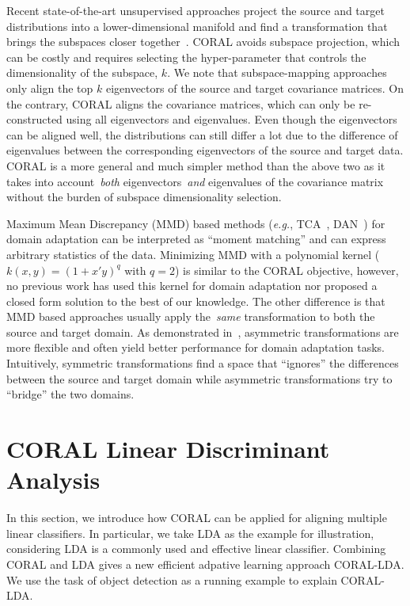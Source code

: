 \documentclass[graybox]{svmult}
\newcommand\eg{\emph{e.g.}}
\begin{document}
Recent state-of-the-art unsupervised approaches project the source and target distributions into a lower-dimensional manifold and find a transformation that brings the subspaces closer together~\cite{gopalan-iccv11,gfk,sa,outlooks}. CORAL avoids subspace projection, which can be costly and requires selecting the hyper-parameter that controls the dimensionality of the subspace, $k$. We note that subspace-mapping approaches~\cite{outlooks,sa} only align the top $k$ eigenvectors of the source and target covariance matrices. On the contrary, CORAL aligns the covariance matrices, which can only be re-constructed using all eigenvectors and eigenvalues. Even though the eigenvectors can be aligned well, the distributions can still differ a lot due to the difference of eigenvalues between the corresponding eigenvectors of the source and target data. CORAL is a more general and much simpler method than the above two as it takes into account~\emph{both} eigenvectors~\emph{and} eigenvalues of the covariance matrix without the burden of subspace dimensionality selection. 

Maximum Mean Discrepancy (MMD) based methods (\eg, TCA~\cite{tca}, DAN~\cite{dan_long15}) for domain adaptation can be interpreted as ``moment matching'' and can express arbitrary statistics of the data. Minimizing MMD with a polynomial kernel ($k(x,y) = (1+x'y)^q$ with $q=2$) is similar to the CORAL objective, however, no previous work has used this kernel for domain adaptation nor proposed a closed form solution to the best of our knowledge. 
The other difference is that MMD based approaches usually apply the~\emph{same} transformation to both the source and target domain. As demonstrated in~\cite{ref:kulis_cvpr11,outlooks,sa}, asymmetric transformations are more flexible and often yield better performance for domain adaptation tasks. Intuitively, symmetric transformations find a space that ``ignores'' the differences between the source and target domain while asymmetric transformations try to ``bridge'' the two domains.
 \section{CORAL Linear Discriminant Analysis}
\label{sec:coral-lda}

In this section, we introduce how CORAL can be applied for aligning multiple linear classifiers. In particular, we take LDA as the example for illustration, considering LDA is  a commonly used and effective linear classifier. Combining CORAL and LDA gives a new efficient adpative learning approach CORAL-LDA.  We use the task of object detection as a running example to explain CORAL-LDA.
\end{document}
